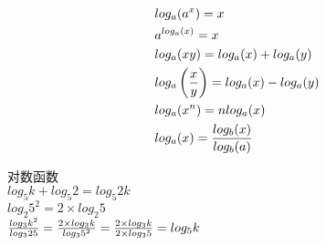 \begin{tcolorbox}
	\begin{align}
		 & log_a(a^x) = x                                      \\
		 & a^{log_a(x)} = x                                    \\
		 & log_a(xy) = log_a(x) + log_a(y)                     \\
		 & log_a\left({x \over y}\right) = log_a(x) - log_a(y) \\
		 & log_a(x^n) = nlog_a(x)                              \\
		 & log_a(x) = {log_b(x) \over log_b(a)}
	\end{align}
\end{tcolorbox}

\begin{tcolorbox}
	对数函数\\
	$ log_5{k} + log_5{2} = log_5{2k} $\\
	$ log_2{5^2} = 2 \times log_2{5} $\\
	$ {log_3{k^2} \over log_3{25}} = {2 \times log_3{k} \over log_3{5^2}} = {2 \times log_3{k} \over 2 \times log_3{5}} = log_5{k} $
\end{tcolorbox}

\newpage